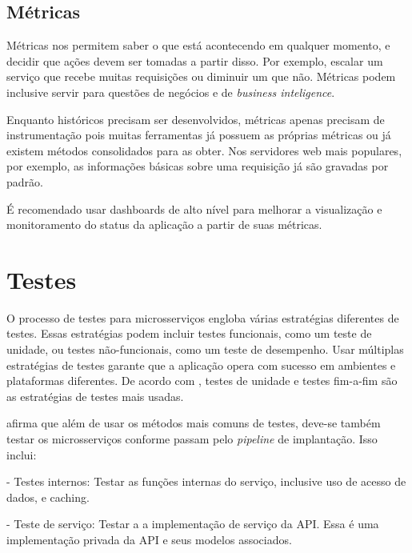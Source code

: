 
\subsection{Métricas}
Métricas nos permitem saber o que está acontecendo em qualquer momento, e decidir que ações devem ser tomadas a partir disso. Por exemplo, escalar um serviço que recebe muitas requisições ou diminuir um que não. Métricas podem inclusive servir para questões de negócios e de \emph{business inteligence}. 

Enquanto históricos precisam ser desenvolvidos, métricas apenas precisam de instrumentação pois muitas ferramentas já possuem as próprias métricas ou já existem métodos consolidados para as obter. Nos servidores web mais populares, por exemplo, as informações básicas sobre uma requisição já são gravadas por padrão.

É recomendado usar dashboards de alto nível para melhorar a visualização e monitoramento do status da aplicação a partir de suas métricas.

\section{Testes}

O processo de testes para microsserviços engloba várias estratégias diferentes de testes. Essas estratégias podem incluir testes funcionais, como um teste de unidade, ou testes não-funcionais, como um teste de desempenho. Usar múltiplas estratégias de testes garante que a aplicação opera com sucesso em ambientes e plataformas diferentes. De acordo com , testes de unidade e testes fim-a-fim são as estratégias de testes mais usadas.


 afirma que além de usar os métodos mais comuns de testes, deve-se também testar os microsserviços conforme passam pelo \emph{pipeline} de implantação. Isso inclui:

- Testes internos: Testar as funções internas do serviço, inclusive uso de acesso de dados, e caching.

- Teste de serviço: Testar a a implementação de serviço da API. Essa é uma implementação privada da API e seus modelos associados.

